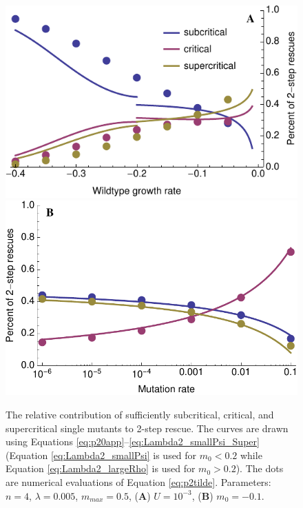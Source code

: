 \documentclass[9pt,twocolumn,twoside,lineno]{gsajnl}
\begin{document}
\begin{figure}[htb]
\centering
\includegraphics[width=\linewidth]{p2RelContrGrowth.pdf}\\
\includegraphics[width=\linewidth]{p2RelContrMutationSlow.pdf}
\caption{
The relative contribution of sufficiently subcritical, critical, and supercritical single mutants to 2-step rescue.
The curves are drawn using Equations \ref{eq:p20app}--\ref{eq:Lambda2_smallPsi_Super} (Equation \ref{eq:Lambda2_smallPsi} is used for $m_0<0.2$ while Equation \ref{eq:Lambda2_largeRho} is used for $m_0>0.2$).
The dots are numerical evaluations of Equation \ref{eq:p2tilde}.
Parameters: $n=4$, $\lambda=0.005$, $m_{max}=0.5$, (\textbf{A}) $U=10^{-3}$, (\textbf{B}) $m_0 = -0.1$.
}%
\label{fig:2stepstyle}
\end{figure}
\end{document}
